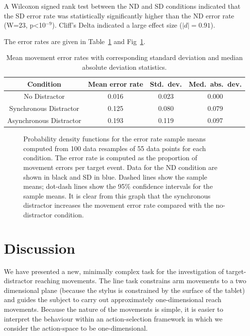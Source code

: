 \documentclass[10pt,letterpaper]{article}
\begin{document}
A Wilcoxon signed
rank test between the ND and SD conditions indicated that the SD error
rate was statistically significantly higher than the ND error rate
(W=23, p\textless10$^{-9}$). Cliff's Delta indicated a large effect
size ($|d|=0.91$).

The error rates are given in Table~\ref{table:error_rates} and
Fig~\ref{bootstrap_errors}.

\begin{table}[ht]
\caption{Mean movement error rates with corresponding standard
  deviation and median absolute deviation statistics.}
\centering
\begin{tabular}{c c c c}
\hline
\textbf{Condition} & \textbf{Mean error rate} & \textbf{Std.~dev.} & \textbf{Med.~abs.~dev.} \\ [0.5ex]
\hline
No Distractor & 0.016 & 0.023 & 0.000 \\
Synchronous Distractor & 0.125 & 0.080 & 0.079 \\
Asynchronous Distractor & 0.193 & 0.119 & 0.097 \\ [1ex]
\hline
\end{tabular}
\label{table:error_rates}
\end{table}

\begin{figure}[htb!]
\centering
\caption[Bootstrapped error PDFS] {Probability density functions for
  the error rate sample means computed from 100 data resamples of 55
  data points for each condition. The error rate is computed as the
  proportion of movement errors per target event. Data for the ND
  condition are shown in black and SD in blue. Dashed lines show the
  sample means; dot-dash lines show the 95\% confidence intervals for
  the sample means. It is clear from this graph that
  the synchronous distractor increases the movement error rate
  compared with the no-distractor condition.}
\label{bootstrap_errors}
\end{figure}

\section*{Discussion}

We have presented a new, minimally complex task for the investigation
of target-distractor reaching movements.  The line task constrains arm
movements to a two dimensional plane (because the stylus is
constrained by the surface of the tablet) and guides the subject to
carry out approximately one-dimensional reach movements. Because the
nature of the movements is simple, it is easier to interpret the
behaviour within an action-selection framework in which we consider
the action-space to be one-dimensional.
\end{document}
